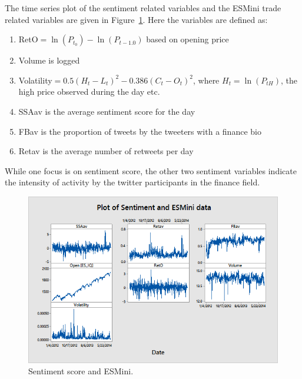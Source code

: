 The time series plot of the sentiment related variables and the ESMini trade related variables are given in Figure~\ref{fig:sentimentesmini}. Here the variables are defined as:
        \begin{enumerate}[--]
        \item RetO$=\ln(P_{t_0}) - \ln(P_{t-1.0})$ based on opening price
        \item Volume is logged
        \item Volatility$= 0.5(H_t-L_t)^2 - 0.386(C_t-O_t)^2$, where $H_t=\ln(P_{tH})$, the high price observed during the day etc.
        \item SSAav is the average sentiment score for the day
        \item FBav is the proportion of tweets by the tweeters with a finance bio
        \item Retav is the average number of retweets per day 
        \end{enumerate}
While one focus is on sentiment score, the other two sentiment variables indicate the intensity of activity by the twitter participants in the finance field. 

	\begin{figure}[!ht]
	\centering
	\includegraphics[width=\textwidth]{chapters/chapter_news_an/figures/ch4sec4sentimentesmini} 
	\caption{Sentiment score and ESMini. \label{fig:sentimentesmini}}
	\end{figure}


